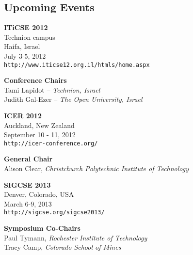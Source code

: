 \newpage
\begin{center}
\section*{Upcoming Events}

\vspace{0.5in}
\textsf{\textbf{ITiCSE 2012}} \\
Technion campus \\
Haifa, Israel \\
July 3-5, 2012 \\
\verb~http://www.iticse12.org.il/htmls/home.aspx~

\textbf{Conference Chairs} \\
Tami Lapidot – \emph{Technion, Israel} \\
Judith Gal-Ezer – \emph{The Open University, Israel}

\vspace{.25in}

\textsf{\textbf{ICER 2012}} \\
Auckland, New Zealand \\
September 10 - 11, 2012 \\
\verb~http://icer-conference.org/~

\textbf{General Chair} \\
Alison Clear, \emph{Christchurch Polytechnic Institute of Technology}

\vspace{.25in}

\textsf{\textbf{SIGCSE 2013}} \\
Denver, Colorado, USA \\
March 6-9, 2013 \\
\verb~http://sigcse.org/sigcse2013/~

\textbf{Symposium Co-Chairs} \\
Paul Tymann, \emph{Rochester Institute of Technology}  \\
Tracy Camp, \emph{Colorado School of Mines}

\end{center}